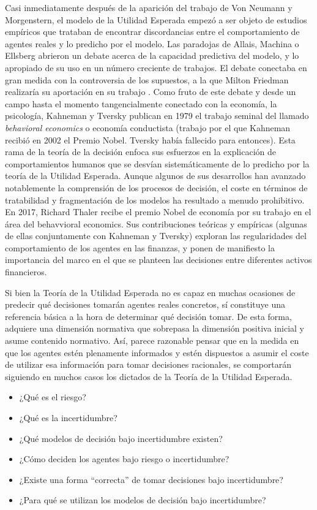 \documentclass{nuevotema}
\begin{document}
Casi inmediatamente después de la aparición del trabajo de Von Neumann y Morgenstern, el modelo de la Utilidad Esperada empezó a ser objeto de estudios empíricos que trataban de encontrar discordancias entre el comportamiento de agentes reales y lo predicho por el modelo. Las paradojas de Allais, Machina o Ellsberg abrieron un debate acerca de la capacidad predictiva del modelo, y lo apropiado de su uso en un número creciente de trabajos. El debate conectaba en gran medida con la controversia de los supuestos, a la que Milton Friedman realizaría su aportación en su trabajo . Como fruto de este debate y desde un campo hasta el momento tangencialmente conectado con la economía, la psicología, Kahneman y Tversky publican en 1979 el trabajo seminal del llamado \textit{behavioral economics} o economía conductista (trabajo por el que Kahneman recibió en 2002 el Premio Nobel. Tversky había fallecido para entonces). Esta rama de la teoría de la decisión enfoca sus esfuerzos en la explicación de comportamientos humanos que se desvían sistemáticamente de lo predicho por la teoría de la Utilidad Esperada. Aunque algunos de sus desarrollos han avanzado notablemente la comprensión de los procesos de decisión, el coste en términos de tratabilidad y fragmentación de los modelos ha resultado a menudo prohibitivo. En 2017, Richard Thaler recibe el premio Nobel de economía por su trabajo en el área del behavvioral economics. Sus contribuciones teóricas y empíricas (algunas de ellas conjuntamente con Kahneman y Tversky) exploran las regularidades del comportamiento de los agentes en las finanzas, y ponen de manifiesto la importancia del marco en el que se planteen las decisiones entre diferentes activos financieros.

Si bien la Teoría de la Utilidad Esperada no es capaz en muchas ocasiones de predecir qué decisiones tomarán agentes reales concretos, sí constituye una referencia básica a la hora de determinar qué decisión  tomar. De esta forma, adquiere una dimensión normativa que sobrepasa la dimensión positiva inicial y asume contenido normativo. Así, parece razonable pensar que en la medida en que los agentes estén plenamente informados y estén dispuestos a asumir el coste de utilizar esa información para tomar decisiones racionales, se comportarán siguiendo en muchos casos los dictados de la Teoría de la Utilidad Esperada.

\begin{itemize}
    \item ¿Qué es el riesgo?
    \item ¿Qué es la incertidumbre?
    \item ¿Qué modelos de decisión bajo incertidumbre existen?
    \item ¿Cómo deciden los agentes bajo riesgo o incertidumbre?
    \item ¿Existe una forma ``correcta'' de tomar decisiones bajo incertidumbre?
    \item ¿Para qué se utilizan los modelos de decisión bajo incertidumbre?
\end{itemize}
\end{document}
